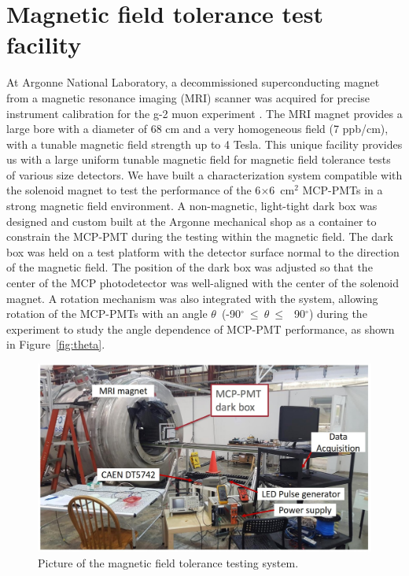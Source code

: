\documentclass[preprint,5p]{elsarticle}
\begin{document}
\section{Magnetic field tolerance test facility} \label{sc}
At Argonne National Laboratory, a decommissioned superconducting magnet from a 
magnetic resonance imaging (MRI) scanner was acquired for precise instrument 
calibration for the g-2 muon experiment \cite{18}. The MRI magnet provides a 
large bore with a diameter of 68 cm and a very homogeneous field (7 ppb/cm), 
with a tunable magnetic field strength up to 4 Tesla. This unique facility 
provides us with a large uniform tunable magnetic field for magnetic field 
tolerance tests of various size detectors. We have built a characterization 
system compatible with the solenoid magnet to test the performance of the 
6$\times$6~cm$^2$ MCP-PMTs in a strong magnetic field environment. A 
non-magnetic, light-tight dark box was designed and custom built at the Argonne 
mechanical shop as a container to constrain the MCP-PMT during the testing 
within the magnetic field. The dark box was held on a test platform with the 
detector surface normal to the direction of the magnetic field. The position of 
the dark box was adjusted so that the center of the MCP photodetector was 
well-aligned with the center of the solenoid magnet. A rotation mechanism was 
also integrated with the system, allowing rotation of the MCP-PMTs with an 
angle $\theta$~(-90$^{\circ}~\leq~\theta~\leq~$~90$^{\circ}$) during the 
experiment to study the angle dependence of MCP-PMT performance, as shown in 
Figure~\ref{fig:theta}.

\begin{figure}[tbp]
\centering \includegraphics[scale=0.4]{fig/Figure4.jpg}
\caption{Picture of the magnetic field tolerance testing system.} \label{fig:4}
\end{figure}
\end{document}
